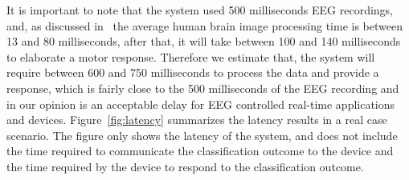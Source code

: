 It is important to note that the system used 500 milliseconds EEG recordings, and, as discussed in~\cite{trafton2014blink} the average human brain image processing time is between 13 and 80 milliseconds, after that, it will take between 100 and 140 milliseconds to elaborate a motor response.
Therefore we estimate that, the system will require between 600 and 750 milliseconds to process the data and provide a response, which is fairly close to the 500 milliseconds of the EEG recording and in our opinion is an acceptable delay for EEG controlled real-time applications and devices.
Figure~\ref{fig:latency} summarizes the latency results in a real case scenario.
The figure only shows the latency of the system, and does not include the time required to communicate the classification outcome to the device and the time required by the device to respond to the classification outcome.
